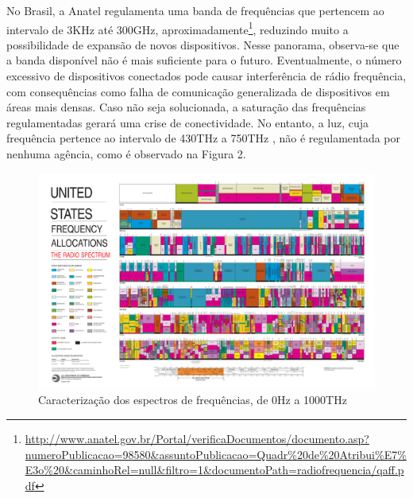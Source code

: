 \documentclass[
12pt,				%
openright,			%
twoside,			%
a4paper,			%
hyphens,
english,			%
french,				%
spanish,			%
brazil				%
]{abntex2}
\begin{document}
		No Brasil, a Anatel regulamenta uma banda de frequências que pertencem ao intervalo  de 3KHz até 300GHz, aproximadamente\footnote{\url{http://www.anatel.gov.br/Portal/verificaDocumentos/documento.asp?numeroPublicacao=98580&assuntoPublicacao=Quadr\%20de\%20Atribui\%E7\%E3o\%20&caminhoRel=null&filtro=1&documentoPath=radiofrequencia/qaff.pdf}}, reduzindo muito a possibilidade de expansão de novos dispositivos. Nesse panorama, observa-se que a banda disponível não é mais suficiente para o futuro. Eventualmente, o número excessivo de dispositivos conectados pode causar interferência de rádio frequência, com consequências como falha de comunicação generalizada de dispositivos em áreas mais densas. Caso não seja solucionada, a saturação das frequências regulamentadas gerará uma crise de conectividade. 
		No entanto, a luz, cuja frequência pertence ao intervalo de 430THz a 750THz \cite{vision}, não é regulamentada por nenhuma agência, como é observado na Figura 2.

		\begin{figure}[!htb]
			\caption{\label{fig_fcc}Caracterização dos espectros de frequências, de 0Hz a 1000THz}
			\begin{center}
				  \includegraphics[width=\textwidth, trim={36.5cm 3.1cm 40cm 61cm},clip]{2003-allochrt.pdf}
				
			\end{center}
		\end{figure}
		
\end{document}

